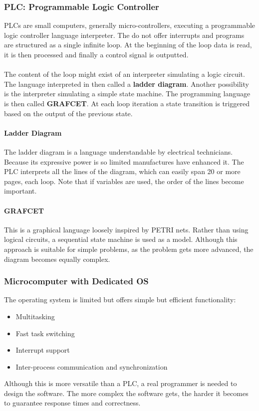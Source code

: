 \documentclass[../main.tex]{subfiles}
\begin{document}
\subsubsection{PLC: Programmable Logic Controller}
PLCs are small computers, generally micro-controllers, executing a programmable logic controller language interpreter. The do not offer interrupts and programs are structured as a single infinite loop. At the beginning of the loop data is read, it is then processed and finally a control signal is outputted.
\\\\
The content of the loop might exist of an interpreter simulating a logic circuit. The language interpreted in then called a \textbf{ladder diagram}. Another possibility is the interpreter simulating a simple state machine. The programming language is then called \textbf{GRAFCET}. At each loop iteration a state transition is triggered based on the output of the previous state.

\paragraph{Ladder Diagram} 
The ladder diagram is a language understandable by electrical technicians. Because its expressive power is so limited manufactures have enhanced it. The PLC interprets all the lines of the diagram, which can easily span 20 or more pages, each loop. Note that if variables are used, the order of the lines become important.  

\paragraph{GRAFCET} This is a graphical language loosely inspired by PETRI nets. Rather than using logical circuits, a sequential state machine is used as a model. Although this approach is suitable for simple problems, as the problem gets more advanced, the diagram becomes equally complex.

\subsubsection{Microcomputer with Dedicated OS}
The operating system is limited but offers simple but efficient functionality:
\begin{itemize}
	\item Multitasking
	\item Fast task switching
	\item Interrupt support
	\item Inter-process communication and synchronization
\end{itemize}
Although this is more versatile than a PLC, a real programmer is needed to design the software. The more complex the software gets, the harder it becomes to guarantee response times and correctness.
\end{document}
